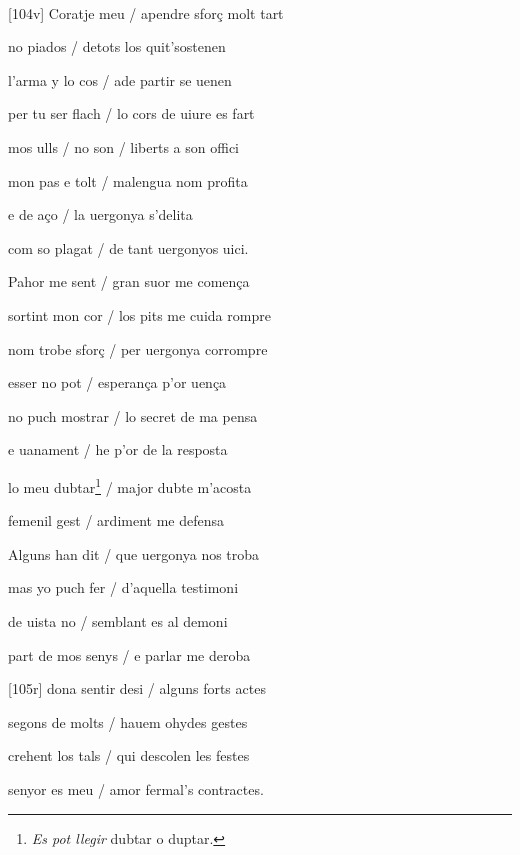 \documentclass[12pt]{article}
\renewcommand{\espaiAbansEtiquetaPoema}{\vspace{0ex}}
\begin{document}
\begin{estrofa}

\espaiAbansEtiquetaPoema

\\

\end{estrofa}


\begin{estrofa}

 [104v] Coratje meu / apendre sfor\c{c} molt tart

 no piados / detots los quit'sostenen

 l'arma y lo cos / ade partir se uenen

 per tu ser flach / lo cors de uiure es fart

 mos ulls / no son / liberts a son offici

 mon pas e tolt / malengua nom profita

 e de a\c{c}o / la uergonya s'delita

 com so plagat / de tant uergonyos uici.

\end{estrofa}



\begin{estrofa}

 Pahor me sent / gran suor me comen\c{c}a

 sortint mon cor / los pits me cuida rompre

 nom trobe sfor\c{c} / per uergonya corrompre

 esser no pot / esperan\c{c}a p'or uen\c{c}a

 no puch mostrar / lo secret de ma pensa

 e uanament / he p'or de la resposta

 lo meu dubtar\footnote{\textit{Es pot llegir} dubtar o duptar.} / major dubte
m'acosta

 femenil gest / ardiment me defensa

\end{estrofa}



\begin{estrofa}

 Alguns han dit / que uergonya nos troba

 mas yo puch fer / d'aquella testimoni

 de uista no / semblant es al demoni

 part de mos senys / e parlar me deroba

 [105r] dona sentir desi / alguns forts actes

 segons de molts / hauem ohydes gestes

 crehent los tals / qui descolen les festes

 senyor es meu / amor fermal's contractes.

\end{estrofa}
\end{document}
